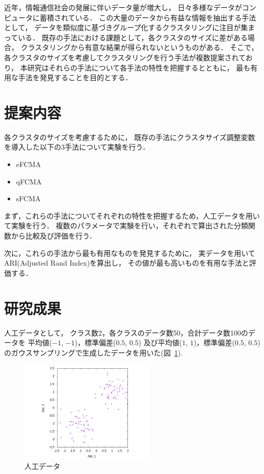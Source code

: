 \documentclass[twocolumn, a4paper]{icethesisabst}
\begin{document}
近年，情報通信社会の発展に伴いデータ量が増大し，
日々多様なデータがコンピュータに蓄積されている．
この大量のデータから有益な情報を抽出する手法として，
データを類似度に基づきグループ化するクラスタリングに注目が集まっている．
既存の手法における課題として，各クラスタのサイズに差がある場合，
クラスタリングから有意な結果が得られないというものがある．
そこで，各クラスタのサイズを考慮してクラスタリングを行う手法が複数提案されており，
本研究はそれらの手法について各手法の特性を把握するとともに，
最も有用な手法を発見することを目的とする．


\section{提案内容}

各クラスタのサイズを考慮するために，
既存の手法にクラスタサイズ調整変数を導入した以下の3手法について実験を行う．
\begin{itemize}
 \item eFCMA
 \item qFCMA
 \item sFCMA
\end{itemize}

まず，これらの手法についてそれぞれの特性を把握するため，人工データを用いて実験を行う．
複数のパラメータで実験を行い，それぞれで算出された分類関数から比較及び評価を行う．

次に，これらの手法から最も有用なものを発見するために，
実データを用いてARI(Adjusted Rand Index)を算出し，
その値が最も高いものを有用な手法と評価する．

\section{研究成果}

人工データとして，
クラス数2，各クラスのデータ数50，合計データ数100のデータを
平均値($-1$, $-1$)，標準偏差($0.5$, $0.5$)
及び平均値($1$, $1$)，標準偏差($0.5$, $0.5$)
のガウスサンプリングで生成したデータを用いた(図~\ref{fig:a_data}).

\begin{figure}[htbp]
\centering
\includegraphics[width=6.5cm]{2d-dat.png}
\caption{人工データ}
\label{fig:a_data}
\end{figure}
\end{document}
